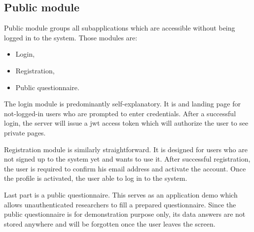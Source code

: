 \subsection{Public module}

Public module groups all subapplications which are accessible without being logged in to the system.
Those modules are:

\begin{itemize}
    \item Login,
    \item Registration,
    \item Public questionnaire.
\end{itemize}

The login module is predominantly self-explanatory.
It is and landing page for not-logged-in users who are prompted to enter credentials.
After a successful login, the server will issue a \gls{jwt} access token which will authorize the user to see private pages.

Registration module is similarly straightforward.
It is designed for users who are not signed up to the system yet and wants to use it.
After successful registration, the user is required to confirm his email address and activate the account.
Once the profile is activated, the user able to log in to the system.

Last part is a public questionnaire.
This serves as an application demo which allows unauthenticated researchers to fill a prepared questionnaire.
Since the public questionnaire is for demonstration purpose only, its data answers are not stored anywhere and will be forgotten once the user leaves the screen.

